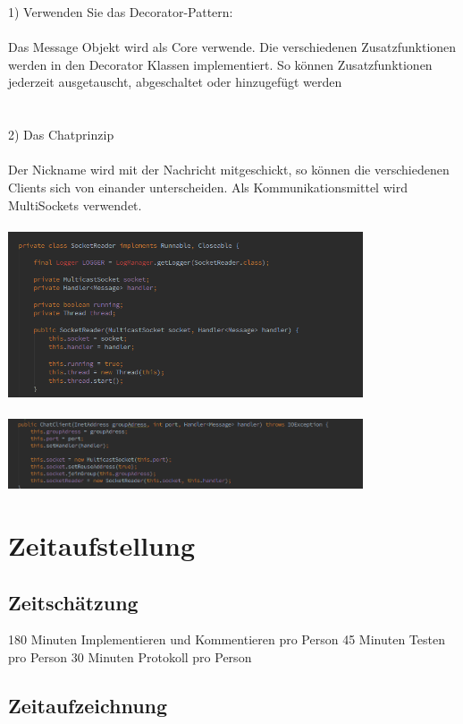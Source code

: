 \documentclass[a4paper, 11pt]{article}
\begin{document}
1) Verwenden Sie das Decorator-Pattern:
\\\\
Das Message Objekt wird als Core verwende.
Die verschiedenen Zusatzfunktionen werden in den Decorator Klassen implementiert. So können Zusatzfunktionen jederzeit ausgetauscht, abgeschaltet oder hinzugefügt werden
\\\\\\
2) Das Chatprinzip
\\\\
Der Nickname wird mit der Nachricht mitgeschickt, so können die verschiedenen Clients sich von einander unterscheiden. Als Kommunikationsmittel wird MultiSockets verwendet.
\\\\
\includegraphics[width=10.5cm]{socketr} \\\\
\includegraphics[width=10.5cm]{socketimp}

\section{Zeitaufstellung}

\subsection{Zeitschätzung}
180 Minuten Implementieren und Kommentieren pro Person
45 Minuten Testen pro Person
30 Minuten Protokoll pro Person

\subsection{Zeitaufzeichnung}
\end{document}
